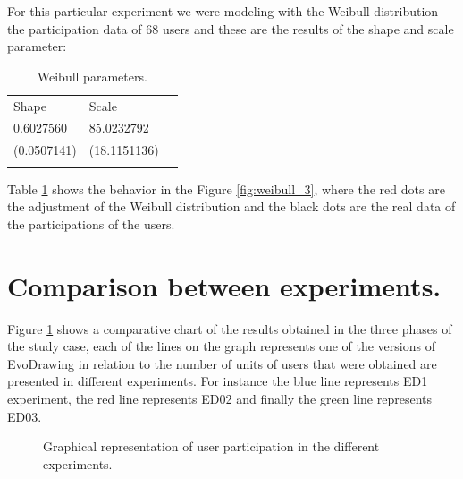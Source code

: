 For this particular experiment we were modeling with the Weibull distribution
\cite{weibull1951wide} the participation data of 68 users and these are the
results of the shape and scale parameter:

\begin{table}
\small
\caption{Weibull parameters.}
\label{tab:weibullp_3}
\centering
\small
\begin{tabular}{p{3cm} p{3cm} p{3cm} }
\hline\noalign{\smallskip}
Shape  & Scale &  \\
\noalign{\smallskip}\hline\noalign{\smallskip}
\small{0.6027560} & \small{85.0232792} & \\ \hline
\small{(0.0507141)} & \small{(18.1151136)} & \\ \hline

\noalign{\smallskip}\hline
\end{tabular}
\end{table}

Table \ref{tab:weibullp_3} shows the behavior in the Figure
\ref{fig:weibull_3}, where the red dots are the adjustment of the Weibull
distribution and the black dots are the real data of the participations of the
users.



\section{Comparison between experiments.}
Figure \ref{fig:comparison} shows a comparative chart of the results obtained
in the three phases of the study case, each of the lines on the graph represents
one of the versions of EvoDrawing in relation to the number of units of users
that were obtained are presented in different experiments. For instance the blue
line represents ED1 experiment, the red line represents ED02
and finally the green line represents ED03.


\begin{figure}
\centering
{} %
\caption{Graphical representation of user participation in the different experiments.}
\label{fig:comparison}
\end{figure}
